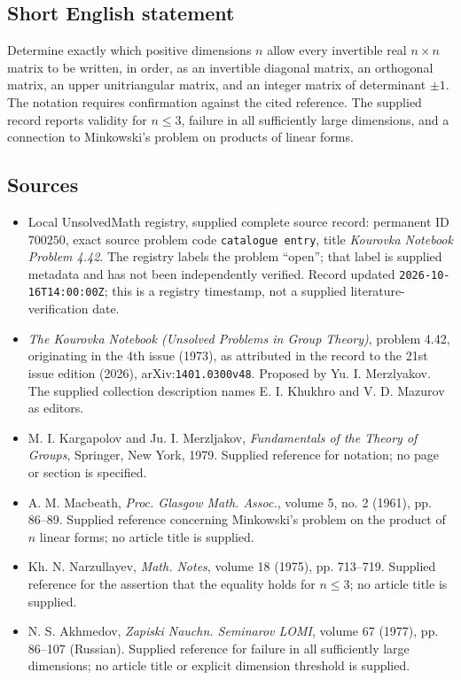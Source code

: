 \documentclass[11pt]{article}
\begin{document}
\subsection{Short English statement}
Determine exactly which positive dimensions \(n\) allow every invertible real \(n\times n\) matrix to be written, in order, as an invertible diagonal matrix, an orthogonal matrix, an upper unitriangular matrix, and an integer matrix of determinant \(\pm1\). The notation requires confirmation against the cited reference. The supplied record reports validity for \(n\le3\), failure in all sufficiently large dimensions, and a connection to Minkowski's problem on products of linear forms.
\subsection{Sources}
\begin{itemize}
\item Local UnsolvedMath registry, supplied complete source record: permanent ID \(700250\), exact source problem code \texttt{catalogue entry}, title \emph{Kourovka Notebook Problem 4.42}. The registry labels the problem ``open''; that label is supplied metadata and has not been independently verified. Record updated \texttt{2026-10-16T14:00:00Z}; this is a registry timestamp, not a supplied literature-verification date.
\item \emph{The Kourovka Notebook (Unsolved Problems in Group Theory)}, problem 4.42, originating in the 4th issue (1973), as attributed in the record to the 21st issue edition (2026), arXiv:\texttt{1401.0300v48}. Proposed by Yu. I. Merzlyakov. The supplied collection description names E. I. Khukhro and V. D. Mazurov as editors.
\item M. I. Kargapolov and Ju. I. Merzljakov, \emph{Fundamentals of the Theory of Groups}, Springer, New York, 1979. Supplied reference for notation; no page or section is specified.
\item A. M. Macbeath, \emph{Proc. Glasgow Math. Assoc.}, volume 5, no. 2 (1961), pp. 86--89. Supplied reference concerning Minkowski's problem on the product of \(n\) linear forms; no article title is supplied.
\item Kh. N. Narzullayev, \emph{Math. Notes}, volume 18 (1975), pp. 713--719. Supplied reference for the assertion that the equality holds for \(n\le3\); no article title is supplied.
\item N. S. Akhmedov, \emph{Zapiski Nauchn. Seminarov LOMI}, volume 67 (1977), pp. 86--107 (Russian). Supplied reference for failure in all sufficiently large dimensions; no article title or explicit dimension threshold is supplied.
\end{itemize}
\end{document}
